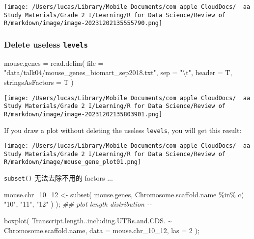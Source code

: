 \documentclass[
]{article}
\let\oldincludegraphics\includegraphics
\renewcommand{\includegraphics}[2][]{\begin{center}\oldincludegraphics[#1]{#2}\end{center}}
\newenvironment{Shaded}{}{}
\newcommand{\AttributeTok}[1]{\textcolor[rgb]{0.49,0.56,0.16}{#1}}
\newcommand{\DecValTok}[1]{\textcolor[rgb]{0.25,0.63,0.44}{#1}}
\newcommand{\DocumentationTok}[1]{\textcolor[rgb]{0.73,0.13,0.13}{\textit{#1}}}
\newcommand{\FunctionTok}[1]{\textcolor[rgb]{0.02,0.16,0.49}{#1}}
\newcommand{\NormalTok}[1]{#1}
\newcommand{\OtherTok}[1]{\textcolor[rgb]{0.00,0.44,0.13}{#1}}
\newcommand{\SpecialCharTok}[1]{\textcolor[rgb]{0.25,0.44,0.63}{#1}}
\newcommand{\StringTok}[1]{\textcolor[rgb]{0.25,0.44,0.63}{#1}}
\begin{document}
\texttt{[image: /Users/lucas/Library/Mobile Documents/com~apple~CloudDocs/~~aa Study Materials/Grade 2 I/Learning/R for Data Science/Review of R/markdown/image/image-20231202135555790.png]}

\hypertarget{delete-useless-levels}{%
\subsubsection{\texorpdfstring{Delete useless
\texttt{levels}}{Delete useless levels}}\label{delete-useless-levels}}

\begin{Shaded}
\begin{Highlighting}[]
\NormalTok{mouse.genes }\OtherTok{=}
  \FunctionTok{read.delim}\NormalTok{(}
    \AttributeTok{file =} \StringTok{"data/talk04/mouse\_genes\_biomart\_sep2018.txt"}\NormalTok{,}
    \AttributeTok{sep =} \StringTok{"}\SpecialCharTok{\textbackslash{}t}\StringTok{"}\NormalTok{,}
    \AttributeTok{header =}\NormalTok{ T, }
    \AttributeTok{stringsAsFactors =}\NormalTok{ T }
\NormalTok{  )}
\end{Highlighting}
\end{Shaded}

\texttt{[image: /Users/lucas/Library/Mobile Documents/com~apple~CloudDocs/~~aa Study Materials/Grade 2 I/Learning/R for Data Science/Review of R/markdown/image/image-20231202135803901.png]}

If you draw a plot without deleting the useless \texttt{levels}, you
will get this result:

\texttt{[image: /Users/lucas/Library/Mobile Documents/com~apple~CloudDocs/~~aa Study Materials/Grade 2 I/Learning/R for Data Science/Review of R/markdown/image/mouse\_gene\_plot01.png]}

\texttt{subset()} 无法去除不用的 factors ...

\begin{Shaded}
\begin{Highlighting}[]
\NormalTok{mouse.chr\_10\_12 }\OtherTok{\textless{}{-}} \FunctionTok{subset}\NormalTok{( mouse.genes,  Chromosome.scaffold.name }\SpecialCharTok{\%in\%} \FunctionTok{c}\NormalTok{( }\StringTok{"10"}\NormalTok{, }\StringTok{"11"}\NormalTok{, }\StringTok{"12"}\NormalTok{ ) );}
\DocumentationTok{\#\# plot length distribution {-}{-}}

\FunctionTok{boxplot}\NormalTok{( Transcript.length..including.UTRs.and.CDS. }\SpecialCharTok{\textasciitilde{}}\NormalTok{ Chromosome.scaffold.name, }
         \AttributeTok{data =}\NormalTok{ mouse.chr\_10\_12, }\AttributeTok{las =} \DecValTok{2}\NormalTok{ );}
\end{Highlighting}
\end{Shaded}
\end{document}
